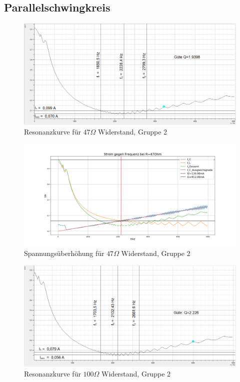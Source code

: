 \documentclass[a4paper, 11pt]{article}
\begin{document}
\newpage
\subsection{Parallelschwingkreis}

\begin{figure}[H]
	\hskip-2cm
	\includegraphics[trim = 0mm 0mm 0mm 0mm,clip, width=20cm]{Bilder/JOParallel47_Breite.png}%
	\caption[Resonanzkurve für $47 \Omega$ Widerstand, Gruppe 1]{Resonanzkurve für $47 \Omega$ Widerstand, Gruppe 2}%
	\label{pic:Abbildung 3}%
\end{figure}
\begin{figure}[H]
	\hskip-2cm
	\includegraphics[trim = 0mm 0mm 0mm 0mm,clip, width=20cm]{Bilder/JOParallel47_Erhoehung.png}%
	\caption[Spannungsüberhöhung für $47 \Omega$ Widerstand, Gruppe 1]{Spannungsüberhöhung für $47 \Omega$ Widerstand, Gruppe 2}%
	\label{pic:Abbildung 3}%
\end{figure}
\begin{figure}[H]
	\hskip-2cm
	\includegraphics[trim = 0mm 0mm 0mm 0mm,clip, width=20cm]{Bilder/JOParallel100_Breite.png}%
	\caption[Resonanzkurve für $100 \Omega$ Widerstand, Gruppe 1]{Resonanzkurve für $100 \Omega$ Widerstand, Gruppe 2}%
	\label{pic:Abbildung 3}%
\end{figure}
\end{document}
